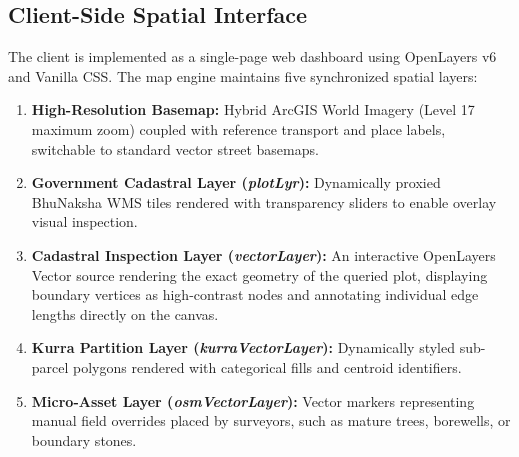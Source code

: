 \documentclass[conference]{IEEEtran}
\begin{document}
\subsection{Client-Side Spatial Interface}
The client is implemented as a single-page web dashboard using OpenLayers v6 and Vanilla CSS. The map engine maintains five synchronized spatial layers:
\begin{enumerate}
    \item \textbf{High-Resolution Basemap:} Hybrid ArcGIS World Imagery (Level 17 maximum zoom) coupled with reference transport and place labels, switchable to standard vector street basemaps.
    \item \textbf{Government Cadastral Layer (\textit{plotLyr}):} Dynamically proxied BhuNaksha WMS tiles rendered with transparency sliders to enable overlay visual inspection.
    \item \textbf{Cadastral Inspection Layer (\textit{vectorLayer}):} An interactive OpenLayers Vector source rendering the exact geometry of the queried plot, displaying boundary vertices as high-contrast nodes and annotating individual edge lengths directly on the canvas.
    \item \textbf{Kurra Partition Layer (\textit{kurraVectorLayer}):} Dynamically styled sub-parcel polygons rendered with categorical fills and centroid identifiers.
    \item \textbf{Micro-Asset Layer (\textit{osmVectorLayer}):} Vector markers representing manual field overrides placed by surveyors, such as mature trees, borewells, or boundary stones.
\end{enumerate}
\end{document}
